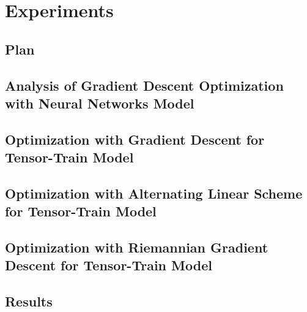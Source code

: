 \documentclass[11pt]{article}
\begin{document}
    \section{Experiments}\label{sec:experiments}

    \subsection{Plan}\label{subsec:plan}
    

    \subsection{Analysis of Gradient Descent Optimization with Neural Networks Model}
    \label{subsec:analysis-of-gradient-descent-optimization-with-neural-networks-model}

    \subsection{Optimization with Gradient Descent for Tensor-Train Model}\label{subsec:optimization-with-gradient-descent}
    

    \subsection{Optimization with Alternating Linear Scheme for Tensor-Train Model}\label{subsec:optimization-with-alternating-linear-scheme}
    

    \subsection{Optimization with Riemannian Gradient Descent for Tensor-Train Model}\label{subsec:optimization-with-riemannian-gradient-descent}
    

    \subsection{Results}\label{subsec:results}
    

\end{document}
